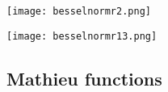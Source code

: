 \texttt{[image: besselnormr2.png]}

\texttt{[image: besselnormr13.png]}


\subsection{Mathieu functions}




